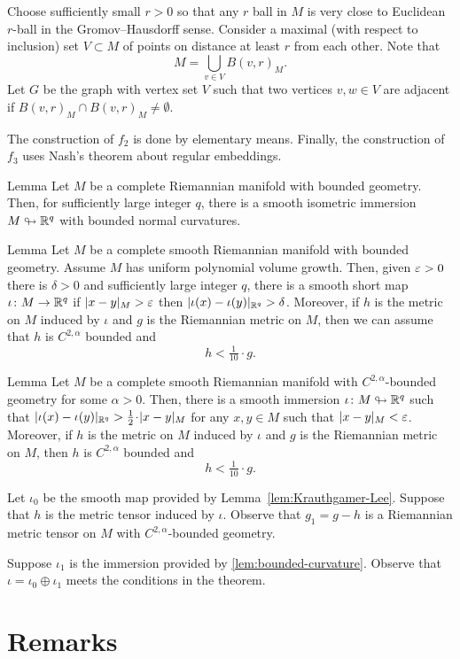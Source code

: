 \documentclass[a4paper,10pt]{article}
\begin{document}
Choose sufficiently small $r>0$ so that any $r$ ball in $M$ is very close to Euclidean $r$-ball in the Gromov--Hausdorff sense.
Consider a maximal (with respect to inclusion) set $V\subset M$ of points on distance at least $r$ from each other.
Note that 
\[M=\bigcup_{v\in V} B(v,r)_M.\]
Let $G$ be the graph with vertex set $V$ such that two vertices $v,w\in V$ are adjacent if $B(v,r)_M\cap B(v,r)_M \ne \emptyset$.


The construction of $f_2$ is done by elementary means.
Finally, the construction of $f_3$ uses Nash's theorem about regular embeddings.




\begin{thm}{Lemma}\label{lem:bounded-curvature}
Let $M$ be a complete Riemannian manifold with bounded geometry.
Then, for sufficiently large integer $q$, there is a smooth isometric immersion $M\looparrowright\mathbb{R}^q$ with bounded normal curvatures.
\end{thm}



\begin{thm}{Lemma}\label{lem:Krauthgamer-Lee}
Let $M$ be a complete smooth Riemannian manifold with bounded geometry.
Assume $M$ has uniform polynomial volume growth.
Then, given $\varepsilon>0$ there is $\delta>0$ and sufficiently large integer $q$, there is a smooth short map $\iota\colon M\to\mathbb{R}^q$ if $|x-y|_M>\varepsilon$ then $|\iota(x)-\iota(y)|_{\mathbb{R}^q}>\delta$.
Moreover, if $h$ is the metric on $M$ induced by $\iota$ and $g$ is the Riemannian metric on $M$, then we can assume that $h$ is $C^{2,\alpha}$ bounded and
\[h<\tfrac1{10}\cdot g.\]

\end{thm}

\begin{thm}{Lemma}\label{lem:Krauthgamer-Lee}
Let $M$ be a complete smooth Riemannian manifold with $C^{2,\alpha}$-bounded geometry for some $\alpha>0$.
Then, there is a smooth immersion $\iota\colon M\looparrowright\mathbb{R}^q$ such that 
$|\iota(x)-\iota(y)|_{\RR^q}>\tfrac12\cdot |x-y|_M$
for any $x,y\in M$ such that $|x-y|_M<\varepsilon$.
Moreover, if $h$ is the metric on $M$ induced by $\iota$ and $g$ is the Riemannian metric on $M$, then $h$ is $C^{2,\alpha}$ bounded and
\[h<\tfrac1{10}\cdot g.\]

\end{thm}

Let $\iota_0$ be the smooth map provided by Lemma~\ref{lem:Krauthgamer-Lee}.
Suppose that $h$ is the metric tensor induced by $\iota$.
Observe that $g_1=g-h$ is a Riemannian metric tensor on $M$ with $C^{2,\alpha}$-bounded geometry.

Suppose $\iota_1$ is the immersion provided by \ref{lem:bounded-curvature}.
Observe that $\iota=\iota_0\oplus\iota_1$ meets the conditions in the theorem.
\qeds

\section{Remarks}

\cite{schick}

{\sloppy
\printbibliography[heading=bibintoc]
\fussy
}
\end{document}
